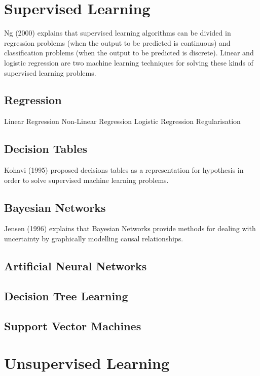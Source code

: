 \section{Supervised Learning}

Ng (2000) explains that supervised learning algorithms can be divided in regression problems (when the output to be predicted is continuous) and classification problems (when the output to be predicted is discrete). Linear and logistic regression are two machine learning techniques for solving these kinds of supervised learning problems.

\subsection{Regression}

Linear Regression
Non-Linear Regression
Logistic Regression
Regularisation

\subsection{Decision Tables}

Kohavi (1995) proposed decisions tables as a representation for hypothesis in order to solve supervised machine learning problems.

\subsection{Bayesian Networks}

Jensen (1996) explains that Bayesian Networks provide methods for dealing with uncertainty by graphically modelling causal relationships.

\subsection{Artificial Neural Networks}

\subsection{Decision Tree Learning}

\subsection{Support Vector Machines}

\section{Unsupervised Learning}

